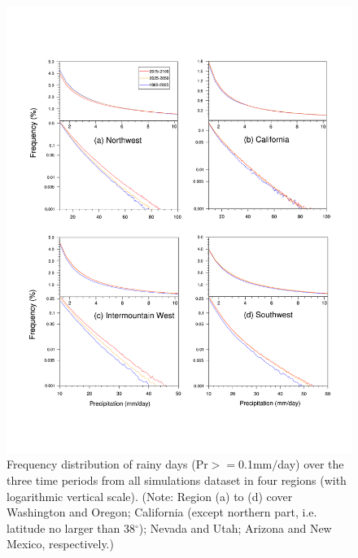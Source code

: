 \documentclass{ametsoc}
\begin{document}
\begin{figure}
\begin{center}
\includegraphics[width=6in]{PP_PDF_region1_4.pdf}
\caption{Frequency distribution of rainy days (Pr$>=$0.1mm$/$day) over the three time periods from all simulations dataset in four regions (with logarithmic vertical scale). (Note: Region (a) to (d) cover Washington and Oregon; California (except northern part, i.e. latitude no larger than 38$^\circ$); Nevada and Utah; Arizona and New Mexico, respectively.)}
\label{fig:prPDF}
\end{center}
\end{figure}
\end{document}
